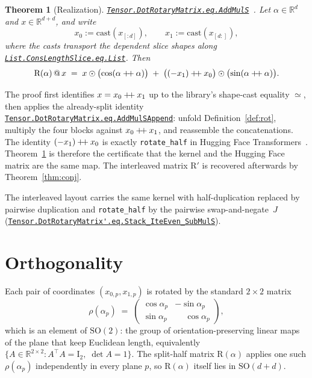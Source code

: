 \documentclass[11pt,a4paper]{article}
\newcommand{\lmod}[1]{\href{http://www.lemma.cn/lean/?module=#1}{\nolinkurl{#1}}}
\newtheorem{theorem}{Theorem}[section]
\newcommand{\R}{\mathbb{R}}
\newcommand{\rot}{\mathrm{R}}
\newcommand{\eye}{\mathrm{I}}
\newcommand{\concat}{\mathbin{+\mkern-4mu+}}
\begin{document}
\begin{theorem}[Realization]
\label{thm:real}
\lmod{Tensor.DotRotaryMatrix.eq.AddMulS}~\cite{lemma_rope_real}.
Let \(\alpha\in\R^d\) and \(x\in\R^{d+d}\), and write
\[
  x_0 := \mathrm{cast}(x_{[:d]}),\qquad
  x_1 := \mathrm{cast}(x_{[d:]}),
\]
where the casts transport the dependent slice shapes along
\lmod{List.ConsLengthSlice.eq.List}.
Then
\begin{equation}
  \label{eq:real}
  \rot(\alpha)\,@\,x
  \;=\;
  x \odot \bigl(\cos(\alpha\concat\alpha)\bigr)
  \;+\;
  \bigl((-x_1)\concat x_0\bigr) \odot \bigl(\sin(\alpha\concat\alpha)\bigr).
\end{equation}
\end{theorem}

The proof first identifies \(x=x_0\concat x_1\) up to the library's shape-cast equality \(\simeq\), then applies the already-split identity
\lmod{Tensor.DotRotaryMatrix.eq.AddMulSAppend}:
unfold Definition~\ref{def:rot}, multiply the four blocks against \(x_0\concat x_1\), and reassemble the concatenations.
The identity \((-x_1)\concat x_0\) is exactly \texttt{rotate\_half} in Hugging Face Transformers~\cite{huggingface_rope_utils}.
Theorem~\ref{thm:real} is therefore the certificate that the kernel and the Hugging Face matrix are the same map.
The interleaved matrix \(\rot'\) is recovered afterwards by Theorem~\ref{thm:conj}.

The interleaved layout carries the same kernel with half-duplication replaced by pairwise duplication and \texttt{rotate\_half} by the pairwise swap-and-negate~$J$ (\lmod{Tensor.DotRotaryMatrix'.eq.Stack_IteEven_SubMulS}).

\section{Orthogonality}
\label{sec:orth}

Each pair of coordinates \((x_{0,p},x_{1,p})\) is rotated by the standard \(2\times 2\) matrix
\begin{equation}
  \label{eq:so2}
  \rho(\alpha_p)
  \;=\;
  \begin{pmatrix}
    \cos\alpha_p & -\sin\alpha_p \\
    \sin\alpha_p & \phantom{-}\cos\alpha_p
  \end{pmatrix},
\end{equation}
which is an element of \(\mathrm{SO}(2)\): the group of orientation-preserving linear maps of the plane that keep Euclidean length, equivalently
\(\{A\in\R^{2\times 2}:A^\top A=\eye_2,\;\det A=1\}\).
The split-half matrix \(\rot(\alpha)\) applies one such \(\rho(\alpha_p)\) independently in every plane \(p\), so \(\rot(\alpha)\) itself lies in \(\mathrm{SO}(d+d)\).
\end{document}
